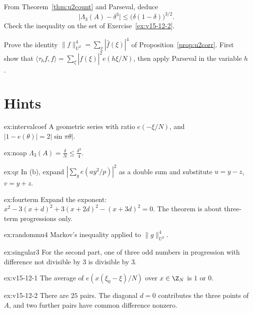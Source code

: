 \begin{exercise}[$\star\star$]\label{ex:v15-12-3}
From Theorem~\ref{thm:u2count} and Parseval, deduce
\[
\bigl|\Lambda_3(A)-\delta^3\bigr|\le\bigl(\delta(1-\delta)\bigr)^{3/2}.
\]
Check the inequality on the set of Exercise~\ref{ex:v15-12-2}.
\end{exercise}

\begin{exercise}[$\star\star\star$]\label{ex:v15-12-4}
Prove the identity \(\|f\|_{U^2}^4=\sum_\xi|\hat f(\xi)|^4\) of Proposition~\ref{prop:u2corr}. First show that \(\langle\tau_hf,f\rangle=\sum_\xi|\hat f(\xi)|^2e(h\xi/N)\), then apply Parseval in the variable \(h\).
\end{exercise}

\section{Hints}

\begin{hint}{ex:intervalcoef}
A geometric series with ratio $e(-\xi/N)$, and $|1-e(\theta)|=2|\sin\pi\theta|$.
\end{hint}
\begin{hint}{ex:noap}
$\Lambda_3(A)=\frac\delta N\le\frac{\delta^3}4$.
\end{hint}
\begin{hint}{ex:qr}
In (b), expand $|\sum_ye(ay^2/p)|^2$ as a double sum and substitute $u=y-z$, $v=y+z$.
\end{hint}
\begin{hint}{ex:fourterm}
Expand the exponent: $x^2-3(x+d)^2+3(x+2d)^2-(x+3d)^2=0$. The theorem is about three-term progressions only.
\end{hint}
\begin{hint}{ex:randommu4}
Markov's inequality applied to $\|g\|_{U^2}^4$.
\end{hint}
\begin{hint}{ex:singular3}
For the second part, one of three odd numbers in progression with difference not divisible by $3$ is divisible by $3$.
\end{hint}

\begin{hint}{ex:v15-12-1}
The average of \(e(x(\xi_0-\xi)/N)\) over \(x\in\Z_N\) is \(1\) or \(0\).
\end{hint}

\begin{hint}{ex:v15-12-2}
There are \(25\) pairs. The diagonal \(d=0\) contributes the three points of \(A\), and two further pairs have common difference nonzero.
\end{hint}

